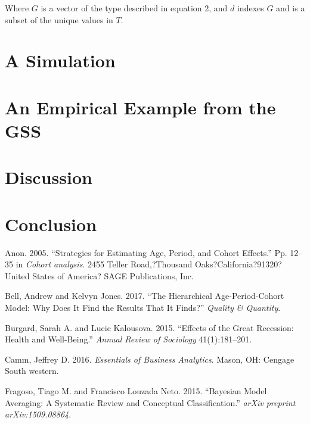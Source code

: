 \documentclass[]{article}
\begin{document}
Where \(G\) is a vector of the type described in equation 2, and \(d\)
indexes \(G\) and is a subset of the unique values in \(T\).

\section{A Simulation}\label{a-simulation}

\section{An Empirical Example from the
GSS}\label{an-empirical-example-from-the-gss}

\section{Discussion}\label{discussion}

\section*{Conclusion}\label{conclusion}

Anon. 2005. ``Strategies for Estimating Age, Period, and Cohort
Effects.'' Pp. 12--35 in \emph{Cohort analysis}. 2455 Teller
Road,?Thousand Oaks?California?91320?United States of America? SAGE
Publications, Inc.

Bell, Andrew and Kelvyn Jones. 2017. ``The Hierarchical
Age-Period-Cohort Model: Why Does It Find the Results That It Finds?''
\emph{Quality \& Quantity}.

Burgard, Sarah A. and Lucie Kalousova. 2015. ``Effects of the Great
Recession: Health and Well-Being.'' \emph{Annual Review of Sociology}
41(1):181--201.

Camm, Jeffrey D. 2016. \emph{Essentials of Business Analytics}. Mason,
OH: Cengage South western.

Fragoso, Tiago M. and Francisco Louzada Neto. 2015. ``Bayesian Model
Averaging: A Systematic Review and Conceptual Classification.''
\emph{arXiv preprint arXiv:1509.08864}.
\end{document}
